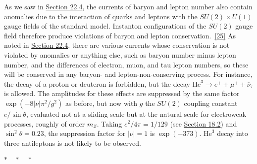As we saw in \hyperref[sec:22.4]{Section 22.4}, the currents of baryon and lepton number also
contain anomalies due to the interaction of quarks and leptons with the
$SU(2)\times U(1)$ gauge fields of the standard model. Instanton
configurations of the $SU(2)$ gauge field therefore produce violations
of baryon and lepton conservation.~\hyperref[ch23-ref-25]{[25]} As noted
in \hyperref[sec:22.4]{Section 22.4}, there are various currents whose conservation is not
violated by anomalies or anything else, such as baryon number minus
lepton number, and the differences of electron, muon, and tau lepton
numbers, so these will be conserved in any baryon- and
lepton-non-conserving process. For instance, the decay of a proton or
deuteron is forbidden, but the decay
$\mathrm{He}^3\to e^++\mu^++\overline\nu_\tau$ is allowed. The
amplitudes for these effects are suppressed by the same factor
$\exp(-8|\nu|\pi^2/g^2)$ as before, but now with $g$ the $SU(2)$
coupling constant $e/\sin\theta$, evaluated not at a sliding scale but at
the natural scale for electroweak processes, roughly of order $m_Z$.
Taking $e^2/4\pi=1/129$ (see \hyperref[sec:18.2]{Section 18.2}) and
$\sin^2\theta=0.23$, the suppression factor for $|\nu|=1$ is
$\exp(-373)$. $\mathrm{He}^3$ decay into three antileptons is not likely
to be observed.

\begin{center}
$* \quad * \quad *$
\end{center}

